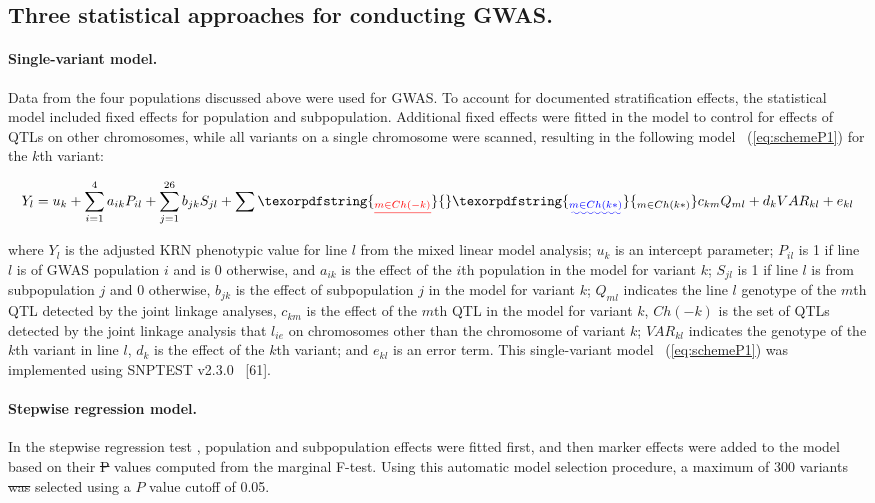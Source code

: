 \documentclass[10pt,letterpaper]{article}
\providecommand{\DIFaddtex}[1]{{\protect\color{blue}\uwave{#1}}} %
\providecommand{\DIFdeltex}[1]{{\protect\color{red}\sout{#1}}}                      %
\providecommand{\DIFaddbegin}{} %
\providecommand{\DIFaddend}{} %
\providecommand{\DIFdelbegin}{} %
\providecommand{\DIFdelend}{} %
\providecommand{\DIFadd}[1]{\texorpdfstring{\DIFaddtex{#1}}{#1}} %
\providecommand{\DIFdel}[1]{\texorpdfstring{\DIFdeltex{#1}}{}} %
\begin{document}
\subsection*{Three statistical approaches for conducting GWAS.}
\paragraph{Single-variant model.} 
Data from the four populations discussed above were used for GWAS. To account for documented stratification effects, the statistical model included fixed effects for population and subpopulation. Additional fixed effects were fitted in the model to control for effects of QTLs on other chromosomes, while all variants on a single chromosome were scanned, resulting in the following model ~(\ref{eq:schemeP1}) for the $k$th variant:  

\begin{equation}\label{eq:schemeP1} 
Y_l = u_k + \sum_{i=1}^{4}a_{ik}P_{il} + \sum_{j=1}^{26} b_{jk}S_{jl} + \sum\DIFdelbegin \DIFdel{_{m \in Ch(-k)}}\DIFdelend \DIFaddbegin \DIFadd{_{m \in Ch(k*)}}\DIFaddend c_{km}Q_{ml} + d_kVAR_{kl} + e_{kl}
\end{equation}


where $Y_l$ is the adjusted KRN phenotypic value for line $l$ from the mixed linear model analysis; $u_k$ is an intercept parameter; $P_{il}$ is 1 if line $l$ is of GWAS population $i$ and is 0 otherwise, and $a_{ik}$ is the effect of the $i$th population in the model for variant $k$; $S_{jl}$ is 1 if line $l$ is from subpopulation $j$ and 0 otherwise, $b_{jk}$ is the effect of subpopulation $j$ in the model for variant $k$; $Q_{ml}$ indicates the line $l$ genotype of the $m$th QTL detected by the joint linkage analyses, $c_{km}$ is the effect of the $m$th QTL in the model for variant $k$, \DIFdelbegin \DIFdel{$Ch(-k)$ }\DIFdelend \DIFaddbegin \DIFadd{$Ch(k*)$ }\DIFaddend is the set of QTLs detected by the joint linkage analysis that \DIFdelbegin \DIFdel{$l_{ie}$ }\DIFdelend \DIFaddbegin \DIFadd{lie }\DIFaddend on chromosomes other than the chromosome of variant $k$; $VAR_{kl}$ indicates the genotype of the $k$th variant in line $l$, $d_k$ is the effect of the $k$th variant; and $e_{kl}$ is an error term. This single-variant model ~(\ref{eq:schemeP1}) was implemented using SNPTEST v2.3.0 ~\cite{Marchini2010}[61].

\paragraph{Stepwise regression model.} 
In the stepwise regression test \DIFaddbegin \DIFadd{(forward regression)}\DIFaddend , population and subpopulation effects were fitted first, and then marker effects were added to the model based on their \DIFdelbegin \DIFdel{P }\DIFdelend \DIFaddbegin \DIFadd{$P$ }\DIFaddend values computed from the marginal F-test. Using this automatic model selection procedure, a maximum of 300 variants \DIFdelbegin \DIFdel{was }\DIFdelend \DIFaddbegin \DIFadd{were }\DIFaddend selected using a $P$ value cutoff of 0.05.
\end{document}

